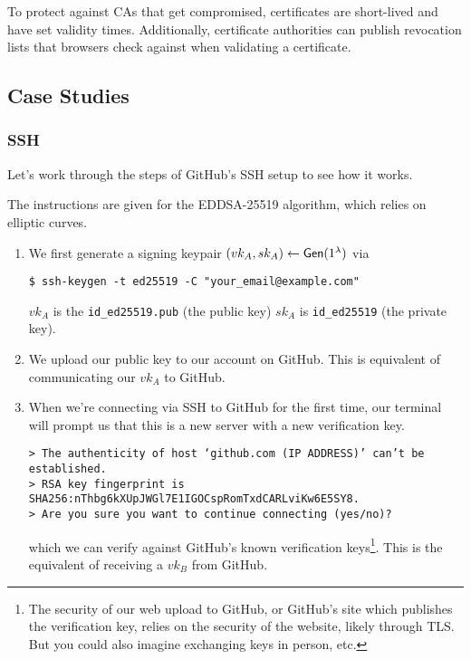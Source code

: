 To protect against CAs that get compromised, certificates are short-lived and have set validity times. Additionally, certificate authorities can publish revocation lists that browsers check against when validating a certificate.

\subsection{Case Studies}

\subsubsection{SSH}


Let's work through the steps of GitHub's SSH setup to see how it works.

The instructions are given for the EDDSA-25519 algorithm, which relies on elliptic curves.

\begin{enumerate}
    \item We first generate a signing keypair $(vk_A, sk_A) \leftarrow \operatorname{\mathsf{Gen}}(1^\lambda)$ via

          \texttt{\$ ssh-keygen -t ed25519 -C "your\_email@example.com"}

          $vk_A$ is the \texttt{id\_ed25519.pub} (the public key) $sk_A$ is \texttt{id\_ed25519} (the private key).
    \item We upload our public key to our account on GitHub. This is equivalent of communicating our $vk_A$ to GitHub.
    \item When we're connecting via SSH to GitHub for the first time, our terminal will prompt us that this is a new server with a new verification key.

          \texttt{> The authenticity of host `github.com (IP ADDRESS)' can't be established. \\
              > RSA key fingerprint is SHA256:nThbg6kXUpJWGl7E1IGOCspRomTxdCARLviKw6E5SY8. \\
              > Are you sure you want to continue connecting (yes/no)?}

          which we can verify against GitHub's known verification keys\footnote{The security of our web upload to GitHub, or GitHub's site which publishes the verification key, relies on the security of the website, likely through TLS. But you could also imagine exchanging keys in person, etc. }. This is the equivalent of receiving a $vk_B$ from GitHub.
\end{enumerate}

